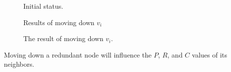 \begin{figure}[!htb]
	\centering
	\hfil
	\hfil
	\caption{Initial status.}
\end{figure}
\begin{figure}[!htb]
	\centering
	 \hfil
	 \hfil
	\caption{Results of moving down $v_i$}
\end{figure}
\begin{figure}[!htb]
	\centering
	\caption{The result of moving down $v_i$.}
	\label{fig:th3}
\end{figure}
\begin{theorem}
	Moving down a redundant node will influence the $P$, $R$, and $C$ values of its neighbors.
\end{theorem}
